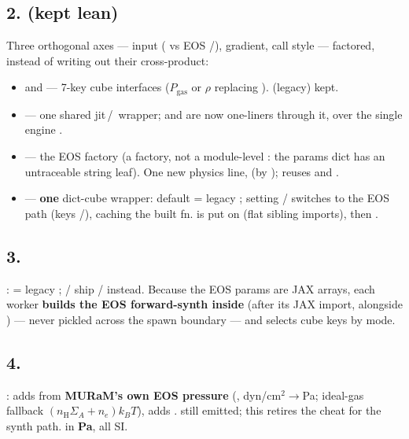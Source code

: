 \subsection*{2.  (kept lean)}
Three orthogonal axes --- input ( vs EOS /), gradient, call style ---
factored, instead of writing out their cross-product:
\begin{itemize}
  \item {} and  --- 7-key cube interfaces
        ($P_\mathrm{gas}$ or $\rho$ replacing ).  (legacy) kept.
  \item {} --- one shared jit\,/\, wrapper;
         and  are now one-liners through it, over the single
        engine .
  \item {} --- the EOS factory (a factory,
        not a module-level : the params dict has an untraceable string leaf). One new physics
        line,  (by ); reuses
         and .
  \item {} --- \textbf{one}
        dict-cube wrapper: default = legacy ; setting / switches
        to the EOS path (keys /), caching the built fn. 
        is put on  (flat sibling imports), then .
\end{itemize}

\subsection*{3. }
:  = legacy ; /
ship / instead. Because the EOS params are JAX arrays, each worker \textbf{builds the
EOS forward-synth inside } (after its JAX import, alongside ) --- never
pickled across the spawn boundary --- and  selects cube keys by mode.

\subsection*{4. }
:  adds 
from \textbf{MURaM's own EOS pressure} (, dyn/cm$^2\!\to$Pa; ideal-gas fallback
$(n_\mathrm{H}\Sigma_A+n_e)k_BT$),  adds .  still emitted; this
retires the   cheat for the synth path.  in \textbf{Pa}, all SI.

